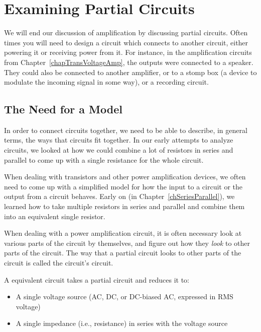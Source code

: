 \chapter{Examining Partial Circuits}
\label{chapPartialCircuits}


We will end our discussion of amplification by discussing partial circuits.
Often times you will need to design a circuit which connects to another circuit, either powering it or receiving power from it.
For instance, in the amplification circuits from Chapter~\ref{chapTransVoltageAmp}, the outputs were connected to a speaker.
They could also be connected to another amplifier, or to a stomp box (a device to modulate the incoming signal in some way), or a recording circuit.

\section{The Need for a Model}

In order to connect circuits together, we need to be able to describe, in general terms, the ways that circuits fit together.
In our early attempts to analyze circuits, we looked at how we could combine a lot of resistors in series and parallel to come up with a single resistance for the whole circuit.

When dealing with transistors and other power amplification devices, we often need to come up with a simplified model for how the input to a circuit or the output from a circuit behaves.
Early on (in Chapter~\ref{chSeriesParallel}), we learned how to take multiple resistors in series and parallel and combine them into an equivalent single resistor.

When dealing with a power amplification circuit, it is often necessary look at various parts of the circuit by themselves, and figure out how they \emph{look} to other parts of the circuit.
The way that a partial circuit looks to other parts of the circuit is called the circuit's  circuit.


A \thev equivalent circuit takes a partial circuit and reduces it to:

\begin{itemize}
\item A single voltage source (AC, DC, or DC-biased AC, expressed in RMS voltage)
\item A single impedance (i.e., resistance) in series with the voltage source
\end{itemize}

